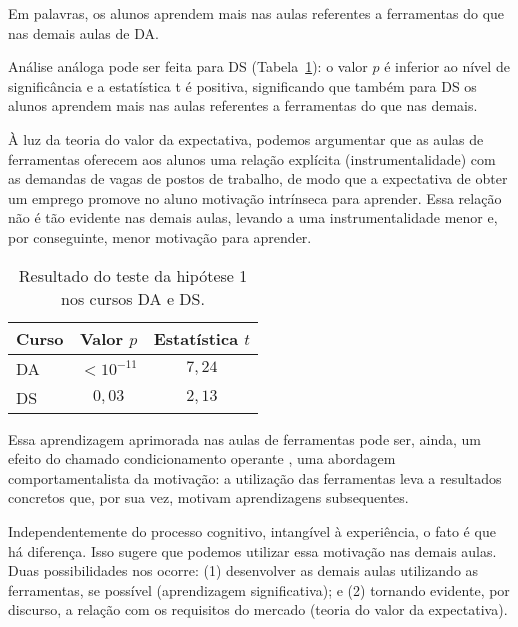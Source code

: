 Em palavras, os alunos aprendem mais nas aulas referentes a ferramentas do que nas demais aulas de DA.


Análise análoga pode ser feita para DS (Tabela~\ref{tab:hipotese-1}): o valor $p$ é inferior ao nível de significância e a estatística t é positiva, significando que também para DS os alunos aprendem mais nas aulas referentes a ferramentas do que nas demais.

À luz da teoria do valor da expectativa, podemos argumentar que as aulas de ferramentas oferecem aos alunos uma relação explícita (instrumentalidade) com as demandas de vagas de postos de trabalho, de modo que a expectativa de obter um emprego promove no aluno motivação intrínseca para aprender.
Essa relação não é tão evidente nas demais aulas, levando a uma instrumentalidade menor e, por conseguinte, menor motivação para aprender.


\begin{table}
	\centering
	\caption{Resultado do teste da hipótese 1 nos cursos DA e DS.}
	\label{tab:hipotese-1}

	\begin{tabular}{lcc}
	\toprule
	Curso & Valor $p$   & Estatística $t$ \\
	\midrule
	DA    & $<10^{-11}$ & $7,24$ \\
	DS    & $0,03$      & $2,13$ \\ 
	\bottomrule
	\end{tabular}
\end{table}

Essa aprendizagem aprimorada nas aulas de ferramentas pode ser, ainda, um efeito do chamado condicionamento operante \cite{Petri}, uma abordagem comportamentalista da motivação: a utilização das ferramentas leva a resultados concretos que, por sua vez, motivam aprendizagens subsequentes.

Independentemente do processo cognitivo, intangível à experiência, o fato é que há diferença.
Isso sugere que podemos utilizar essa motivação nas demais aulas.
Duas possibilidades nos ocorre: (1) desenvolver as demais aulas utilizando as ferramentas, se possível (aprendizagem significativa); e (2) tornando evidente, por discurso, a relação com os requisitos do mercado (teoria do valor da expectativa).